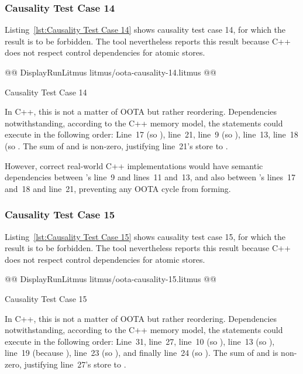 \documentclass[10]{article}
\begin{document}
\subsubsection{Causality Test Case 14}
\label{app:Causality Test Case 14}

Listing~\ref{lst:Causality Test Case 14}
shows causality test case 14, for which the 
result is to be forbidden.
The  tool nevertheless reports this result because C++ does not
respect control dependencies for atomic stores.

\begin{listing}[tbp]
@@ DisplayRunLitmus litmus/oota-causality-14.litmus @@
\caption{Causality Test Case 14}
\label{lst:Causality Test Case 14}
\end{listing}

In C++, this is not a matter of OOTA but rather reordering.
Dependencies notwithstanding, according to the C++ memory model,
the statements could execute in the following order:
Line~17 (so ), line~21, line~9 (so ),
line~13, line~18 (so .
The sum of  and  is non-zero, justifying line~21's
store to .

However, correct real-world C++ implementations would have semantic
dependencies between 's line~9 and lines~11 and~13, and also
between 's lines~17 and~18 and line~21, preventing any
OOTA cycle from forming.

\subsubsection{Causality Test Case 15}
\label{app:Causality Test Case 15}

Listing~\ref{lst:Causality Test Case 15}
shows causality test case 15, for which the 
result is to be forbidden.
The  tool nevertheless reports this result because C++ does not
respect control dependencies for atomic stores.

\begin{listing}[tbp]
@@ DisplayRunLitmus litmus/oota-causality-15.litmus @@
\caption{Causality Test Case 15}
\label{lst:Causality Test Case 15}
\end{listing}

In C++, this is not a matter of OOTA but rather reordering.
Dependencies notwithstanding, according to the C++ memory model,
the statements could execute in the following order:
Line~31, line~27, line~10 (so ), line~13 (so ),
line~19 (because ), line~23 (so ),
and finally line~24 (so ).
The sum of  and  is non-zero, justifying line~27's
store to .
\end{document}
